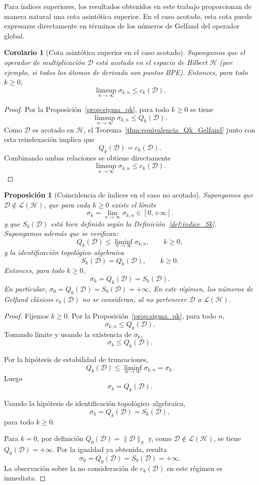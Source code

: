\documentclass[12pt,a4paper]{article}
\newtheorem{corollary}{Corolario}
\newtheorem{proposition}{Proposición}
\theoremstyle{definition}
\theoremstyle{remark}
\newcommand{\D}{\mathcal{D}}
\begin{document}
Para índices superiores, los resultados obtenidos en este trabajo proporcionan de manera natural una cota asintótica superior. En el caso acotado, esta cota puede expresarse directamente en términos de los números de Gelfand del operador global.

\begin{corollary}[Cota asintótica superior en el caso acotado]\label{cor:convergencia_qk_condicional}
  Supongamos que el operador de multiplicación $\D$ está acotado en el espacio de Hilbert $\mathcal{H}$ (por ejemplo, si todos los átomos de derivada son puntos BPE). Entonces, para todo $k \ge 0$,
  \[
    \limsup_{n \to \infty} \sigma_{k,n} \le c_k(\D).
  \]
\end{corollary}

\begin{proof}
  Por la Proposición~\ref{prop:sigma_qk}, para todo $k \ge 0$ se tiene
  \[
    \limsup_{n \to \infty} \sigma_{k,n} \le Q_k(\D).
  \]
  Como $\D$ es acotado en $\mathcal{H}$, el Teorema~\ref{thm:equivalencia_Qk_Gelfand} junto con esta reindexación implica que
  \[
    Q_k(\D) = c_k(\D).
  \]
  Combinando ambas relaciones se obtiene directamente
  \[
    \limsup_{n \to \infty} \sigma_{k,n} \le c_k(\D).
  \]
\end{proof}

\begin{proposition}[Coincidencia de índices en el caso no acotado]\label{prop:coincidencia_no_acotado_pendiente}
  Supongamos que $\D\notin\mathcal{L}(\mathcal{H})$, que para cada $k\ge0$ existe el límite
  \[
    \sigma_k=\lim_{n\to\infty}\sigma_{k,n}\in[0,+\infty].
  \]
  y que $S_k(\D)$ está bien definido según la Definición~\ref{def:indice_Sk}. Supongamos además que se verifican:
  \[
    Q_k(\D)\le \liminf_{n\to\infty}\sigma_{k,n},
    \qquad k\ge0,
  \]
  y la identificación topológico--algebraica
  \[
    S_k(\D)=Q_k(\D),
    \qquad k\ge0.
  \]
  Entonces, para todo $k\ge0$,
  \[
    \sigma_{k}=Q_k(\D)=S_k(\D).
  \]
  En particular, $\sigma_0=Q_0(\D)=S_0(\D)=+\infty$. En este régimen, los números de Gelfand clásicos $c_k(\D)$ no se consideran, al no pertenecer $\D$ a $\mathcal{L}(\mathcal{H})$.
\end{proposition}

\begin{proof}
  Fijemos $k\ge 0$. Por la Proposición~\ref{prop:sigma_qk}, para todo $n$,
  \[
    \sigma_{k,n}\le Q_k(\D).
  \]
  Tomando límite y usando la existencia de $\sigma_k$,
  \[
    \sigma_k\le Q_k(\D).
  \]

  Por la hipótesis de estabilidad de truncaciones,
  \[
    Q_k(\D)\le \liminf_{n\to\infty}\sigma_{k,n}=\sigma_k.
  \]
  Luego
  \[
    \sigma_k=Q_k(\D).
  \]

  Usando la hipótesis de identificación topológico--algebraica,
  \[
    \sigma_k=Q_k(\D)=S_k(\D),
  \]
  para todo $k\ge0$.

  Para $k=0$, por definición $Q_0(\D)=\|\D\|_S$ y, como
  $\D\notin\mathcal L(\mathcal H)$, se tiene $Q_0(\D)=+\infty$.
  Por la igualdad ya obtenida, resulta
  \[
    \sigma_0=Q_0(\D)=S_0(\D)=+\infty.
  \]
  La observación sobre la no consideración de $c_k(\D)$ en este régimen es inmediata.
\end{proof}
\end{document}
